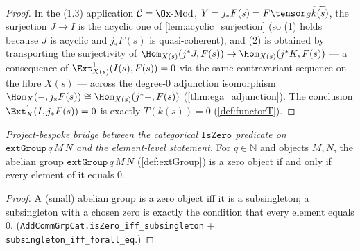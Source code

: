 \begin{lemma}
\begin{proof}
    In the (1.3) application $\mathcal{C} = \Ox\text{-Mod}$,
    $Y = j_*F(s) = F\tensor_S\widetilde{k(s)}$, the surjection $J \to I$ is the
    acyclic one of \cref{lem:acyclic_surjection} (so (1) holds because $J$ is
    acyclic and $j_*F(s)$ is quasi-coherent), and (2) is obtained by transporting
    the surjectivity of $\Hom_{X(s)}(j^*J, F(s)) \to \Hom_{X(s)}(j^*K, F(s))$ — a
    consequence of $\Ext^1_{X(s)}(I(s), F(s)) = 0$ via the same contravariant
    sequence on the fibre $X(s)$ — across the degree-$0$ adjunction isomorphism
    $\Hom_X(-, j_*F(s)) \cong \Hom_{X(s)}(j^*-, F(s))$
    (\cref{thm:ega_adjunction}). The conclusion $\Ext^1_X(I, j_*F(s)) = 0$ is
    exactly $T(k(s)) = 0$ (\cref{def:functorT}).
  \end{proof}
\end{lemma}


\begin{lemma}

  \label{lem:isZero_extGroup_iff}
  \textit{Project-bespoke bridge between the categorical $\mathtt{IsZero}$ predicate
  on $\mathtt{extGroup}\,q\,M\,N$ and the element-level statement.}
  For $q \in \mathbb{N}$ and objects $M, N$, the abelian group
  $\mathtt{extGroup}\,q\,M\,N$ (\cref{def:extGroup}) is a zero object if and only if
  every element of it equals $0$.
  \begin{proof}
    A (small) abelian group is a zero object iff it is a subsingleton; a
    subsingleton with a chosen zero is exactly the condition that every element
    equals $0$. (\texttt{AddCommGrpCat.isZero\_iff\_subsingleton} +
    \texttt{subsingleton\_iff\_forall\_eq}.)
  \end{proof}
\end{lemma}

